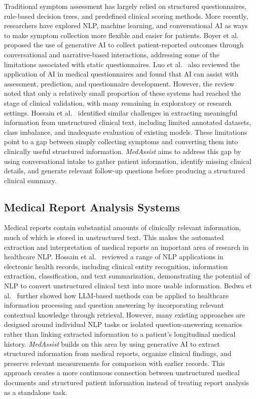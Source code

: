 \documentclass[conference]{IEEEtran}
\begin{document}
Traditional symptom assessment has largely relied on structured questionnaires, rule-based decision trees, and predefined clinical scoring methods. More recently, researchers have explored NLP, machine learning, and conversational AI as ways to make symptom collection more flexible and easier for patients. Boyer et al.~\cite{boyer2025} proposed the use of generative AI to collect patient-reported outcomes through conversational and narrative-based interactions, addressing some of the limitations associated with static questionnaires. Luo et al.~\cite{luo2025} also reviewed the application of AI in medical questionnaires and found that AI can assist with assessment, prediction, and questionnaire development. However, the review noted that only a relatively small proportion of these systems had reached the stage of clinical validation, with many remaining in exploratory or research settings. Hossain et al.~\cite{hossain2023} identified similar challenges in extracting meaningful information from unstructured clinical text, including limited annotated datasets, class imbalance, and inadequate evaluation of existing models. These limitations point to a gap between simply collecting symptoms and converting them into clinically useful structured information. \textit{MedAssist} aims to address this gap by using conversational intake to gather patient information, identify missing clinical details, and generate relevant follow-up questions before producing a structured clinical summary.

\subsection{Medical Report Analysis Systems}

Medical reports contain substantial amounts of clinically relevant information, much of which is stored in unstructured text. This makes the automated extraction and interpretation of medical reports an important area of research in healthcare NLP. Hossain et al.~\cite{hossain2023} reviewed a range of NLP applications in electronic health records, including clinical entity recognition, information extraction, classification, and text summarization, demonstrating the potential of NLP to convert unstructured clinical text into more usable information. Bedwa et al.~\cite{bedwa2026} further showed how LLM-based methods can be applied to healthcare information processing and question answering by incorporating relevant contextual knowledge through retrieval. However, many existing approaches are designed around individual NLP tasks or isolated question-answering scenarios rather than linking extracted information to a patient's longitudinal medical history. \textit{MedAssist} builds on this area by using generative AI to extract structured information from medical reports, organize clinical findings, and preserve relevant measurements for comparison with earlier records. This approach creates a more continuous connection between unstructured medical documents and structured patient information instead of treating report analysis as a standalone task.
\end{document}
